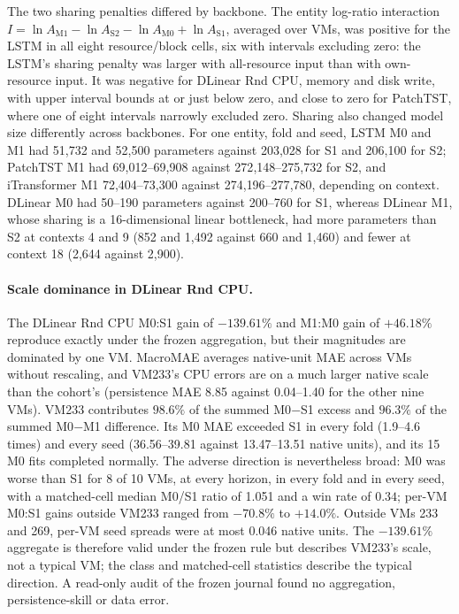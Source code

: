 \documentclass[a4paper,fleqn]{cas-dc}
\begin{document}
The two sharing penalties differed by backbone. The entity log-ratio
interaction $I=\ln A_{\mathrm{M1}}-\ln A_{\mathrm{S2}}-\ln A_{\mathrm{M0}}
+\ln A_{\mathrm{S1}}$, averaged over VMs, was positive for the LSTM in all eight
resource/block cells, six with intervals excluding zero: the LSTM's sharing
penalty was larger with all-resource input than with own-resource input. It
was negative for DLinear Rnd CPU, memory and disk write, with upper interval
bounds at or just below zero, and close to zero for PatchTST, where one of
eight intervals narrowly excluded zero. Sharing also changed model size
differently across backbones. For one entity, fold and seed, LSTM M0 and M1
had 51{,}732 and 52{,}500 parameters against 203{,}028 for S1 and 206{,}100
for S2; PatchTST M1 had 69{,}012--69{,}908 against 272{,}148--275{,}732 for
S2, and iTransformer M1 72{,}404--73{,}300 against 274{,}196--277{,}780,
depending on context. DLinear M0 had 50--190 parameters against 200--760 for
S1, whereas DLinear M1, whose sharing is a 16-dimensional linear bottleneck,
had more parameters than S2 at contexts 4 and 9 (852 and 1{,}492 against 660
and 1{,}460) and fewer at context 18 (2{,}644 against 2{,}900).

\paragraph{Scale dominance in DLinear Rnd CPU.}
The DLinear Rnd CPU M0:S1 gain of $-139.61\%$ and M1:M0 gain of $+46.18\%$
reproduce exactly under the frozen aggregation, but their magnitudes are
dominated by one VM. MacroMAE averages native-unit MAE across VMs without
rescaling, and VM233's CPU errors are on a much larger native scale than the
cohort's (persistence MAE 8.85 against 0.04--1.40 for the other nine VMs).
VM233 contributes $98.6\%$ of the summed M0$-$S1 excess and $96.3\%$ of the
summed M0$-$M1 difference. Its M0 MAE exceeded S1 in every fold (1.9--4.6
times) and every seed (36.56--39.81 against 13.47--13.51 native units), and
its 15 M0 fits completed normally. The adverse direction is nevertheless
broad: M0 was worse than S1 for 8 of 10 VMs, at every horizon, in every fold
and in every seed, with a matched-cell median M0/S1 ratio of 1.051 and a win
rate of $0.34$; per-VM M0:S1 gains outside VM233 ranged from $-70.8\%$ to
$+14.0\%$. Outside VMs 233 and 269, per-VM seed spreads were at most 0.046
native units. The $-139.61\%$ aggregate is therefore valid under the frozen
rule but describes VM233's scale, not a typical VM; the class and matched-cell
statistics describe the typical direction. A read-only audit of the frozen
journal found no aggregation, persistence-skill or data error.
\end{document}
